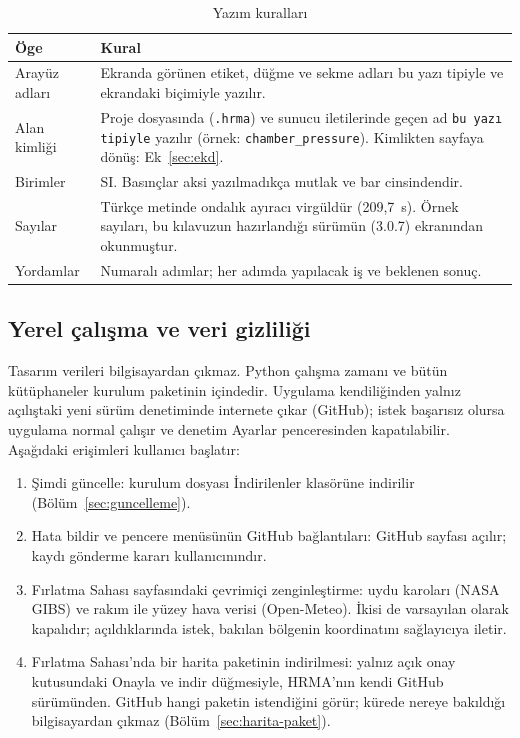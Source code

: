 \documentclass[11pt,a4paper]{article}
\newcommand{\ui}[1]{\textsf{#1}}
\newcommand{\kod}[1]{\texttt{#1}}
\begin{document}
\begin{table}[htbp]
\centering\small
\caption{Yazım kuralları}\label{tab:yazim}
\begin{tabular}{@{}>{\raggedright\arraybackslash}p{4.2cm}>{\raggedright\arraybackslash}p{11.4cm}@{}}
\toprule
\textbf{Öge} & \textbf{Kural} \\
\midrule
Arayüz adları & Ekranda görünen etiket, düğme ve sekme adları \ui{bu yazı tipiyle} ve ekrandaki biçimiyle yazılır. \\
Alan kimliği & Proje dosyasında (\kod{.hrma}) ve sunucu iletilerinde geçen ad \kod{bu yazı tipiyle} yazılır (örnek: \kod{chamber\_\allowbreak{}pressure}). Kimlikten sayfaya dönüş: Ek~\ref{sec:ekd}. \\
Birimler & SI. Basınçlar aksi yazılmadıkça mutlak ve bar cinsindendir. \\
Sayılar & Türkçe metinde ondalık ayıracı virgüldür (209,7~s). Örnek sayıları, bu kılavuzun hazırlandığı sürümün (3.0.7) ekranından okunmuştur. \\
Yordamlar & Numaralı adımlar; her adımda yapılacak iş ve beklenen sonuç. \\
\bottomrule
\end{tabular}
\end{table}

\subsection{Yerel çalışma ve veri gizliliği}

Tasarım verileri bilgisayardan çıkmaz. Python çalışma zamanı ve bütün
kütüphaneler kurulum paketinin içindedir. Uygulama kendiliğinden yalnız
açılıştaki yeni sürüm denetiminde internete çıkar (GitHub); istek başarısız
olursa uygulama normal çalışır ve denetim \ui{Ayarlar} penceresinden
kapatılabilir. Aşağıdaki erişimleri kullanıcı başlatır:

\begin{enumerate}[leftmargin=1.6em]
  \item \ui{Şimdi güncelle}: kurulum dosyası İndirilenler klasörüne indirilir
  (Bölüm~\ref{sec:guncelleme}).
  \item \ui{Hata bildir} ve pencere menüsünün GitHub bağlantıları: GitHub
  sayfası açılır; kaydı gönderme kararı kullanıcınındır.
  \item Fırlatma Sahası sayfasındaki çevrimiçi zenginleştirme: uydu karoları
  (NASA GIBS) ve rakım ile yüzey hava verisi (Open-Meteo). İkisi de
  varsayılan olarak kapalıdır; açıldıklarında istek, bakılan bölgenin
  koordinatını sağlayıcıya iletir.
  \item Fırlatma Sahası'nda bir harita paketinin indirilmesi: yalnız açık onay
  kutusundaki \ui{Onayla ve indir} düğmesiyle, HRMA'nın kendi GitHub
  sürümünden. GitHub hangi paketin istendiğini görür; kürede nereye
  bakıldığı bilgisayardan çıkmaz (Bölüm~\ref{sec:harita-paket}).
\end{enumerate}
\end{document}
